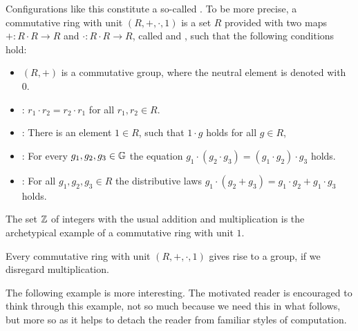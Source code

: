 Configurations like this constitute a so-called . To be more precise, a commutative ring with unit $ (R, +, \cdot, 1) $ is a set $R$ provided with two maps $ +: R \cdot R \to R $ and $ \cdot: R \cdot R \to R $, called  and , such that the following conditions hold:
\begin{itemize}
\item $ \left (R, + \right) $ is a commutative group, where the neutral element is denoted  with $ 0 $.
\item {}: $r_1\cdot r_2 = r_2\cdot r_1$ for all $r_1, r_2\in R$.
\item {}: There is an element $1\in R$, such that $1\cdot g$ holds for all $g\in R$,
\item {}: For every $g_1,g_2,g_3\in\mathbb{G}$ the equation
$g_1\cdot(g_2\cdot g_3) = (g_1\cdot g_2)\cdot g_3$ holds.
\item {}: For all $ g_1, g_2, g_3 \in R $ the distributive laws
$ g_1 \cdot \left (g_2 + g_3 \right) = g_1 \cdot g_2 + g_1 \cdot g_3$ holds.
\end{itemize}
\begin{example} The set $\mathbb{Z}$ of integers with the usual addition and multiplication is the archetypical example of a commutative ring with unit $1$.
\end{example}
\begin{example} Every commutative ring with unit $(R,+,\cdot,1)$ gives rise to a group, if we disregard multiplication.
\end{example}
The following example is more interesting. The motivated reader is encouraged to think through this example, not so much because we need this in what follows, but more so as it helps to detach the reader from familiar styles of computation.
